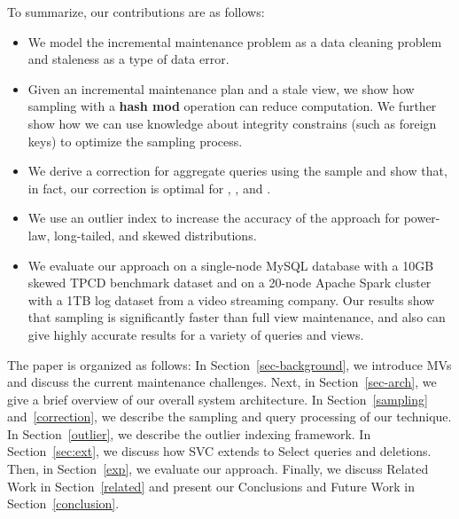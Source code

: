 To summarize, our contributions are as follows:
\begin{itemize}\vspace{-.45em}
\item We model the incremental maintenance problem as a data cleaning problem and staleness as a type of data error.\vspace{-.45em}
\item Given an incremental maintenance plan and a stale view, we show how sampling with a \textbf{hash mod} operation can reduce computation. We further show how we can use knowledge about integrity constrains (such as foreign keys) to optimize the sampling process. \vspace{-.45em}
\item We derive a correction for aggregate queries using the sample and show that, in fact, our correction is optimal for \sumfunc, \countfunc, and \avgfunc. \vspace{-.45em}
\item We use an outlier index to increase the accuracy of the approach for power-law, long-tailed, and skewed distributions.\vspace{-.45em}
\item We evaluate our approach on a single-node MySQL database with a 10GB skewed TPCD benchmark dataset and on a 20-node Apache Spark cluster with a 1TB log dataset from a video streaming company. Our results show that sampling is significantly faster than full view maintenance, and also can give highly accurate results for a variety of queries and views.\vspace{-.45em}
\end{itemize}

The paper is organized as follows: 
In Section~\ref{sec-background}, we introduce MVs and discuss the current maintenance challenges.
Next, in Section~\ref{sec-arch}, we give a brief overview of our overall system architecture.
In Section~\ref{sampling} and~\ref{correction}, we describe the sampling and query processing of our technique.
In Section~\ref{outlier}, we describe the outlier indexing framework.
In Section~\ref{sec:ext}, we discuss how SVC extends to Select queries and deletions.
Then, in Section~\ref{exp}, we evaluate our approach.
Finally, we discuss Related Work in Section~\ref{related} and present our Conclusions and Future Work in Section~\ref{conclusion}.
